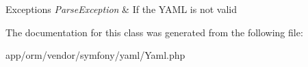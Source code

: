 \begin{DoxyExceptions}{Exceptions}
{\em Parse\+Exception} & If the Y\+A\+ML is not valid \\
\hline
\end{DoxyExceptions}


The documentation for this class was generated from the following file\+:\begin{DoxyCompactItemize}
\item 
app/orm/vendor/symfony/yaml/Yaml.\+php\end{DoxyCompactItemize}
